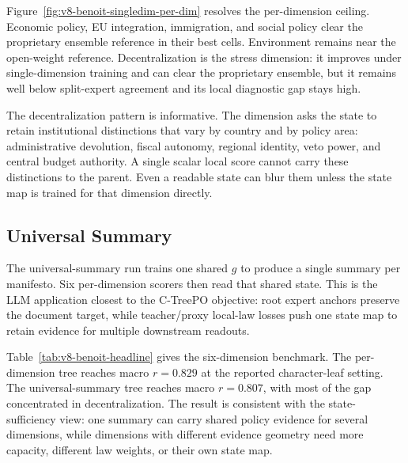 Figure~\ref{fig:v8-benoit-singledim-per-dim} resolves the per-dimension
ceiling. Economic policy, EU integration, immigration, and social policy clear
the proprietary ensemble reference in their best cells. Environment remains
near the open-weight reference. Decentralization is the stress dimension: it
improves under single-dimension training and can clear the proprietary
ensemble, but it remains well below split-expert agreement and its local
diagnostic gap stays high.

The decentralization pattern is informative. The dimension asks the state to
retain institutional distinctions that vary by country and by policy area:
administrative devolution, fiscal autonomy, regional identity, veto power, and
central budget authority. A single scalar local score cannot carry these
distinctions to the parent. Even a readable state can blur them unless the
state map is trained for that dimension directly.

\subsection{Universal Summary}\label{sec:v8-benoit-universal-summary}

The universal-summary run trains one shared \(g\) to produce a single summary
per manifesto. Six per-dimension scorers then read that shared state. This is
the LLM application closest to the C-TreePO objective: root expert anchors
preserve the document target, while teacher/proxy local-law losses push one
state map to retain evidence for multiple downstream readouts.

\begin{table}[t]
  \centering
  \resizebox{\linewidth}{!}{}
  \caption{\textbf{Pearson \(r\) against Benoit expert-survey means.}
  Reference rows reproduce the Benoit benchmark; C-Tree rows use the learned
  manifesto compression pipeline.}
  \label{tab:v8-benoit-headline}
\end{table}

Table~\ref{tab:v8-benoit-headline} gives the six-dimension benchmark. The
per-dimension tree reaches macro \(r=0.829\) at the reported character-leaf
setting. The universal-summary tree reaches macro \(r=0.807\), with most of
the gap concentrated in decentralization. The result is consistent with the
state-sufficiency view: one summary can carry shared policy evidence for
several dimensions, while dimensions with different evidence geometry need
more capacity, different law weights, or their own state map.

